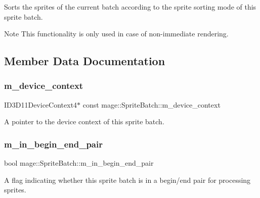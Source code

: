 Sorts the sprites of the current batch according to the sprite sorting mode of this sprite batch.

\begin{DoxyNote}{Note}
This functionality is only used in case of non-\/immediate rendering. 
\end{DoxyNote}


\subsection{Member Data Documentation}
\hypertarget{classmage_1_1_sprite_batch_aa54946d3b052d1434c41c6f45ab627c6}{}\label{classmage_1_1_sprite_batch_aa54946d3b052d1434c41c6f45ab627c6} 
\subsubsection{\texorpdfstring{m\+\_\+device\+\_\+context}{m\_device\_context}}
{\footnotesize\ttfamily I\+D3\+D11\+Device\+Context4$\ast$ const mage\+::\+Sprite\+Batch\+::m\+\_\+device\+\_\+context\hspace{0.3cm}{\ttfamily [private]}}

A pointer to the device context of this sprite batch. \hypertarget{classmage_1_1_sprite_batch_a2f4e56ee07ef37a2906c552b0ea78403}{}\label{classmage_1_1_sprite_batch_a2f4e56ee07ef37a2906c552b0ea78403} 
\subsubsection{\texorpdfstring{m\+\_\+in\+\_\+begin\+\_\+end\+\_\+pair}{m\_in\_begin\_end\_pair}}
{\footnotesize\ttfamily bool mage\+::\+Sprite\+Batch\+::m\+\_\+in\+\_\+begin\+\_\+end\+\_\+pair\hspace{0.3cm}{\ttfamily [private]}}

A flag indicating whether this sprite batch is in a begin/end pair for processing sprites. \hypertarget{classmage_1_1_sprite_batch_a8e333637fa0af0858fd3a3efa1e59c3a}{}\label{classmage_1_1_sprite_batch_a8e333637fa0af0858fd3a3efa1e59c3a} 
